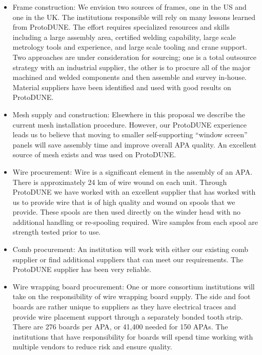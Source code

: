 \begin{itemize}

\item Frame construction: We envision two sources of frames, one in the US and one in the UK. The institutions responsible will rely on many lessons learned from ProtoDUNE. The effort requires specialized resources and skills including a large assembly area, certified welding capability, large scale metrology tools and experience, and large scale tooling and crane support. Two approaches are under consideration for sourcing; one is a total outsource strategy with an industrial supplier, the other is to procure all of the major machined and welded components and then assemble and survey in-house. Material suppliers have been identified and used with good results on ProtoDUNE.

\item Mesh supply and construction: Elsewhere in this proposal we describe the current mesh installation procedure. However, our ProtoDUNE experience leads us to believe that moving to smaller self-supporting ``window screen'' panels will save assembly time and improve overall APA quality. An excellent source of mesh exists and was used on ProtoDUNE.

\item Wire procurement: Wire is a significant element in the assembly of an APA. There is approximately 24 km of wire wound on each unit. Through ProtoDUNE we have worked with an excellent supplier that has worked with us to provide wire that is of high quality and wound on spools that we provide. These spools are then used directly on the winder head with no additional handling or re-spooling required. Wire samples from each spool are strength tested prior to use.

\item Comb procurement: An institution will work with either our existing comb supplier or find additional suppliers that can meet our requirements. The ProtoDUNE supplier has been very reliable.

\item Wire wrapping board procurement: One or more consortium institutions will take on the responsibility of wire wrapping board supply. The side and foot boards are rather unique to suppliers as they have electrical traces and provide wire placement support through a separately bonded tooth strip. There are 276 boards per APA, or 41,400 needed for 150 APAs. The institutions that have responsibility for boards will spend time working with multiple vendors to reduce risk and ensure quality. 


\end{itemize}
